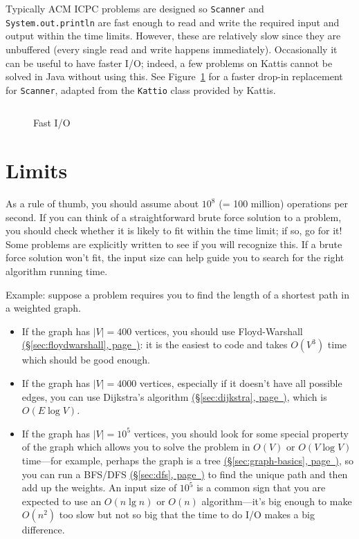 \documentclass[10pt]{book}
\newcommand{\code}[1]{\inputminted[linenos=true,mathescape]{java}{code/#1}}
\newcommand*{\link}[1]{\hyperref[{#1}]{(\S\ref*{#1}, page~\pageref*{#1})}}
\newif\iftodos
\newcommand{\todo}[1]{\iftodos\textcolor{red}{[TODO: #1]}\fi}
\begin{document}
Typically ACM ICPC problems are designed so \texttt{Scanner} and
\texttt{System.out.println} are fast enough to read and write the
required input and output within the time limits.  However, these are
relatively slow since they are unbuffered (every single read and write
happens immediately).  Occasionally it can be useful to have faster
I/O; indeed, a few problems on Kattis cannot be solved in Java without
using this. See Figure~\ref{fig:fastio} for a faster drop-in replacement for
\texttt{Scanner}, adapted from the \texttt{Kattio} class provided by
Kattis.

\begin{figure}
  \small
  \code{java/FastIO.java}
  \caption{Fast I/O}  \label{fig:fastio}
\end{figure}


\chapter{Limits}

As a rule of thumb, you should assume about $10^8$ (= 100 million)
operations per second.  If you can think of a straightforward brute
force solution to a problem, you should check whether it is likely to
fit within the time limit; if so, go for it!  Some problems are
explicitly written to see if you will recognize this.  If a brute
force solution won't fit, the input size can help guide you to search
for the right algorithm running time.

Example: suppose a problem requires you to find the length of a
shortest path in a weighted graph.
\begin{itemize}
\item If the graph has $|V| = 400$ vertices, you should use
  Floyd-Warshall \link{sec:floydwarshall}: it is the easiest to code and takes $O(V^3)$ time
  which should be good enough.
\item If the graph has $|V| = 4000$ vertices, especially if it doesn't
  have all possible edges, you can use Dijkstra's algorithm
  \link{sec:dijkstra}, which is $O(E \log V)$.
\item If the graph has $|V| = 10^5$ vertices, you should look for some
  special property of the graph which allows you to solve the problem
  in $O(V)$ or $O(V \log V)$ time---for example, perhaps the graph is
  a tree \link{sec:graph-basics}, so you can run a BFS/DFS \link{sec:dfs}
  to find the unique path and then add up the weights.  An input size of
  $10^5$ is a common sign that you are expected to use an $O(n \lg n)$
  or $O(n)$ algorithm---it's big enough to make $O(n^2)$ too slow but
  not so big that the time to do I/O makes a big difference.
\end{itemize}
\end{document}
